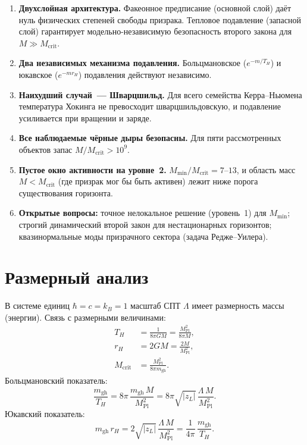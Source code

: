 \documentclass[12pt,a4paper]{article}
\newcommand{\Lam}{\Lambda}
\newcommand{\MPl}{M_{\mathrm{Pl}}}
\newcommand{\Mcrit}{M_{\mathrm{crit}}}
\newcommand{\mghost}{m_{\mathrm{gh}}}
\newcommand{\Thr}{T_{\!H}}
\theoremstyle{plain}
\theoremstyle{definition}
\begin{document}
\begin{enumerate}
  \item \textbf{Двухслойная архитектура.} Факеонное предписание
    (основной слой) даёт нуль физических степеней свободы призрака.
    Тепловое подавление (запасной слой) гарантирует модельно-независимую
    безопасность второго закона для $M \gg \Mcrit$.

  \item \textbf{Два независимых механизма подавления.}
    Больцмановское ($e^{-m/\Thr}$) и юкавское ($e^{-mr_H}$)
    подавления действуют независимо.

  \item \textbf{Наихудший случай~--- Шварцшильд.}
    Для всего семейства Керра--Ньюмена температура Хокинга
    не превосходит шварцшильдовскую, и подавление усиливается
    при вращении и заряде.

  \item \textbf{Все наблюдаемые чёрные дыры безопасны.}
    Для пяти рассмотренных объектов запас $M/\Mcrit > 10^9$.

  \item \textbf{Пустое окно активности на уровне~2.}
    $M_{\min}/\Mcrit = 7$--$13$, и область масс $M < \Mcrit$
    (где призрак мог бы быть активен) лежит ниже порога
    существования горизонта.

  \item \textbf{Открытые вопросы:} точное нелокальное решение
    (уровень~1) для $M_{\min}$; строгий динамический второй закон
    для нестационарных горизонтов; квазинормальные моды призрачного
    сектора (задача Редже--Уилера).
\end{enumerate}


\appendix

\section{Размерный анализ}\label{app:dimensional}

В системе единиц $\hbar = c = k_B = 1$ масштаб СПТ $\Lam$ имеет
размерность массы (энергии). Связь с размерными величинами:
\begin{align}
  \Thr &= \frac{1}{8\pi GM} = \frac{\MPl^2}{8\pi M}, \label{eq:dim_T}\\
  r_H &= 2GM = \frac{2M}{\MPl^2}, \label{eq:dim_rH}\\
  \Mcrit &= \frac{\MPl^2}{8\pi\mghost}. \label{eq:dim_Mcrit}
\end{align}
Больцмановский показатель:
\begin{equation}
  \frac{\mghost}{\Thr} = 8\pi\,\frac{\mghost\,M}{\MPl^2}
  = 8\pi\sqrt{|z_L|}\,\frac{\Lam\, M}{\MPl^2}.
\end{equation}
Юкавский показатель:
\begin{equation}
  \mghost\,r_H = 2\sqrt{|z_L|}\,\frac{\Lam\, M}{\MPl^2}
  = \frac{1}{4\pi}\,\frac{\mghost}{\Thr}.
\end{equation}
\end{document}

